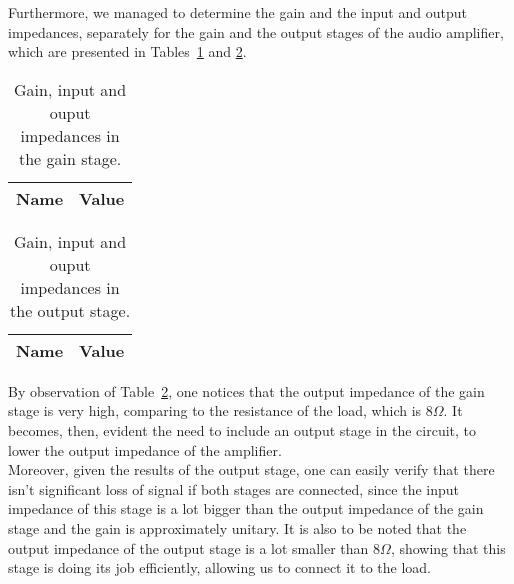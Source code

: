 Furthermore, we managed to determine the gain and the input and output impedances, separately for the gain and the output stages of the audio amplifier, which are presented in Tables~\ref{tab:gaindata} and \ref{tab:outputdata}.

\vspace{3mm}

\noindent
\begin{minipage}[c]{0.5\linewidth}

\begin{table}[H]
  \centering
  \begin{tabular}{|l|r|}
    \hline    
    {\bf Name} & {\bf Value} \\ \hline
    
  \end{tabular}
  \caption{Gain, input and ouput impedances in the gain stage.}
  \label{tab:gaindata}
\end{table}

\end{minipage}
\begin{minipage}[c]{0.5\linewidth}

\begin{table}[H]
  \centering
  \begin{tabular}{|l|r|}
    \hline    
    {\bf Name} & {\bf Value} \\ \hline
    
  \end{tabular}
  \caption{Gain, input and ouput impedances in the output stage.}
  \label{tab:outputdata}
\end{table}

\end{minipage}

\vspace{8mm}

By observation of Table~\ref{tab:outputdata}, one notices that the output impedance of the gain stage is very high, comparing to the resistance of the load, which is $8\Omega$. It becomes, then, evident the need to include an output stage in the circuit, to lower the output impedance of the amplifier.\\

Moreover, given the results of the output stage, one can easily verify that there isn't significant loss of signal if both stages are connected, since the input impedance of this stage is a lot bigger than the output impedance of the gain stage and the gain is approximately unitary. It is also to be noted that the output impedance of the output stage is a lot smaller than $8\Omega$, showing that this stage is doing its job efficiently, allowing us to connect it to the load. \\

